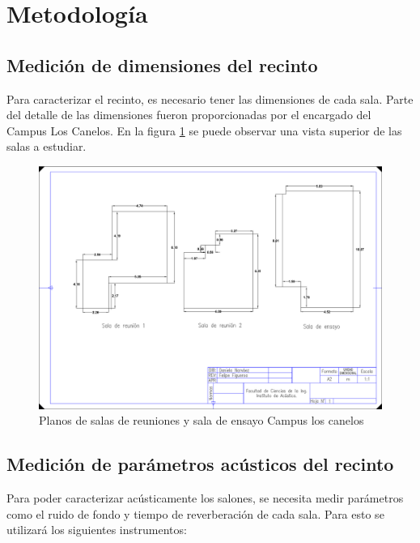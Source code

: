 \section{Metodología}
\subsection{Medición de dimensiones del recinto}
\noindent Para caracterizar el recinto, es necesario tener las dimensiones de cada sala. Parte del detalle de las dimensiones fueron proporcionadas por el encargado del Campus Los Canelos. En la figura \ref{fig: planos CAD} se puede observar una vista superior de las salas a estudiar.

\begin{figure}[H]
    \centering
    \includegraphics[scale=0.3]{Imagenes/Planos/Planos.png}
    \caption{Planos de salas de reuniones y sala de ensayo Campus los canelos}
    \label{fig: planos CAD}
\end{figure}


\subsection{Medición de parámetros acústicos del recinto}
\noindent Para poder caracterizar acústicamente los salones, se necesita medir parámetros como el ruido de fondo y tiempo de reverberación de cada sala. Para esto se utilizará los siguientes instrumentos:


